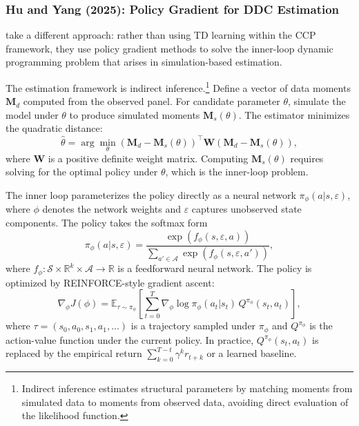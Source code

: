 \subsubsection{Hu and Yang (2025): Policy Gradient for DDC Estimation}

\citet{HuYang2025} take a different approach: rather than using TD learning within the CCP framework, they use policy gradient methods to solve the inner-loop dynamic programming problem that arises in simulation-based estimation.

The estimation framework is indirect inference.\footnote{Indirect inference \citep{GourierouxMonfort1993} estimates structural parameters by matching moments from simulated data to moments from observed data, avoiding direct evaluation of the likelihood function.} Define a vector of data moments $\mathbf{M}_d$ computed from the observed panel. For candidate parameter $\theta$, simulate the model under $\theta$ to produce simulated moments $\mathbf{M}_s(\theta)$. The estimator minimizes the quadratic distance:
\begin{equation}
\hat{\theta} = \arg\min_{\theta} \left(\mathbf{M}_d - \mathbf{M}_s(\theta)\right)^\top \mathbf{W} \left(\mathbf{M}_d - \mathbf{M}_s(\theta)\right), \label{eq:hy_outer}
\end{equation}
where $\mathbf{W}$ is a positive definite weight matrix. Computing $\mathbf{M}_s(\theta)$ requires solving for the optimal policy under $\theta$, which is the inner-loop problem.

The inner loop parameterizes the policy directly as a neural network $\pi_\phi(a | s, \varepsilon)$, where $\phi$ denotes the network weights and $\varepsilon$ captures unobserved state components. The policy takes the softmax form
\begin{equation}
\pi_\phi(a | s, \varepsilon) = \frac{\exp\left(f_\phi(s, \varepsilon, a)\right)}{\sum_{a' \in \mathcal{A}} \exp\left(f_\phi(s, \varepsilon, a')\right)}, \label{eq:hy_policy}
\end{equation}
where $f_\phi: \mathcal{S} \times \mathbb{R}^k \times \mathcal{A} \to \mathbb{R}$ is a feedforward neural network. The policy is optimized by REINFORCE-style gradient ascent:
\begin{equation}
\nabla_\phi J(\phi) = \mathbb{E}_{\tau \sim \pi_\phi}\left[\sum_{t=0}^T \nabla_\phi \log \pi_\phi(a_t | s_t) \, Q^{\pi_\phi}(s_t, a_t)\right], \label{eq:hy_pg}
\end{equation}
where $\tau = (s_0, a_0, s_1, a_1, \ldots)$ is a trajectory sampled under $\pi_\phi$ and $Q^{\pi_\phi}$ is the action-value function under the current policy. In practice, $Q^{\pi_\phi}(s_t, a_t)$ is replaced by the empirical return $\sum_{k=0}^{T-t} \gamma^k r_{t+k}$ or a learned baseline.

